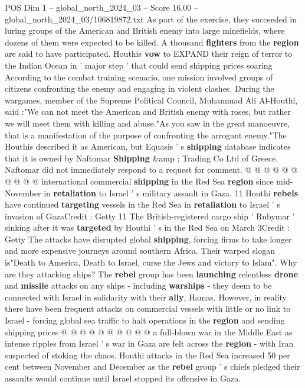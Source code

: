 \begin{textsample}{POS Dim 1 – global\_north\_2024\_03 – Score 16.00 – global\_north\_2024\_03/106819872.txt}  \label{ex:f1_pos_386}
As part of the exercise, they succeeded in luring groups of the American and British enemy into large minefields, where dozens of them were expected to be killed.
A thousand \textbf{fighters} from the \textbf{region} are said to have participated.
Houthis \textbf{vow} to EXPAND their reign of terror to the Indian Ocean in ' major step ' that could send shipping prices soaring According to the combat training scenario, one mission involved groups of citizens confronting the enemy and engaging in violent clashes.
During the wargames, member of the Supreme Political Council, Muhammad Ali Al-Houthi, said :"We can not meet the American and British enemy with roses, but rather we will meet them with killing and abuse."As you saw in the great manoeuvre, that is a manifestation of the purpose of confronting the arrogant enemy."The Houthis described it as American, but Equasis ' s \textbf{shipping} database indicates that it is owned by Naftomar \textbf{Shipping} \&amp ; Trading Co Ltd of Greece.
Naftomar did not immediately respond to a request for comment. @ @ @ @ @ @ @ @ @ @ international commercial \textbf{shipping} in the Red Sea \textbf{region} since mid-November in \textbf{retaliation} to Israel ' s military assault in Gaza. 11 Houthi \textbf{rebels} have continued \textbf{targeting} vessels in the Red Sea in \textbf{retaliation} to Israel ' s invasion of GazaCredit : Getty 11 The British-registered cargo ship ' Rubymar ' sinking after it was \textbf{targeted} by Houthi ' s in the Red Sea on March 3Credit : Getty The attacks have disrupted global \textbf{shipping}, forcing firms to take longer and more expensive journeys around southern Africa.
Their warped slogan is"Death to America, Death to Israel, curse the Jews and victory to Islam".
Why are they attacking ships?
The \textbf{rebel} group has been \textbf{launching} relentless \textbf{drone} and \textbf{missile} attacks on any ships - including \textbf{warships} - they deem to be connected with Israel in solidarity with their \textbf{ally}, Hamas.
However, in reality there have been frequent attacks on commercial vessels with little or no link to Israel - forcing global sea traffic to halt operations in the \textbf{region} and sending shipping prices @ @ @ @ @ @ @ @ @ @ a full-blown war in the Middle East as intense ripples from Israel ' s war in Gaza are felt across the \textbf{region} - with Iran suspected of stoking the chaos.
Houthi attacks in the Red Sea increased 50 per cent between November and December as the \textbf{rebel} group ' s chiefs pledged their assaults would continue until Israel stopped its offensive in Gaza.

\end{textsample}
